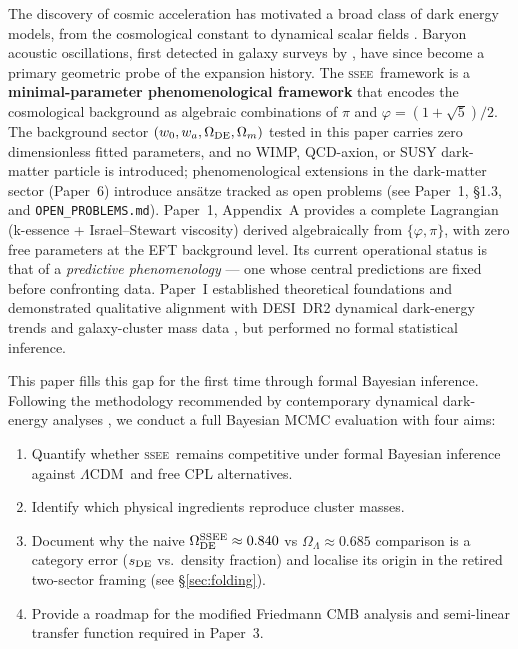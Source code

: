 \documentclass[12pt,a4paper]{article}
\newcommand{\SSEE}{\ifmmode\mathrm{SSEE}\else\textsc{ssee}\fi}
\newcommand{\LCDM}{\ifmmode\Lambda\mathrm{CDM}\else$\Lambda$CDM\fi}
\newcommand{\OmDE}{\Omega_{\mathrm{DE}}}
\begin{document}
The discovery of cosmic acceleration \citep{Perlmutter1999,Riess1998} has motivated
a broad class of dark energy models, from the cosmological constant to dynamical
scalar fields \citep{Weinberg2013,Clifton2012}.
Baryon acoustic oscillations, first detected in galaxy surveys by \citet{Eisenstein2005},
have since become a primary geometric probe of the expansion history.
The \SSEE\ framework \citep{SSEE_paperI} is a
\textbf{minimal-parameter phenomenological framework} that encodes the
cosmological background as algebraic combinations of $\pi$ and
$\varphi=(1+\sqrt{5})/2$.
The background sector $(w_0,w_a,\Omega_{\rm DE},\Omega_m)$ tested in this
paper carries zero dimensionless fitted parameters, and no WIMP, QCD-axion, or SUSY
dark-matter particle is introduced; phenomenological extensions in the dark-matter
sector (Paper~6) introduce ans\"atze tracked as open problems
(see Paper~1, \S1.3, and \texttt{OPEN\_PROBLEMS.md}).
Paper~1, Appendix~A provides a complete Lagrangian (k-essence + Israel--Stewart
viscosity) derived algebraically from $\{\varphi,\pi\}$, with zero free parameters
at the EFT background level.
Its current operational status is that of a
\emph{predictive phenomenology} — one whose central predictions are
fixed before confronting data.
Paper~I established theoretical foundations and demonstrated qualitative
alignment with DESI~DR2 dynamical dark-energy trends \citep{DESI_DR2}
and galaxy-cluster mass data \citep{Zhang2026}, but performed no formal
statistical inference.

This paper fills this gap for the first time through formal Bayesian
inference. Following the methodology recommended by contemporary
dynamical dark-energy analyses \citep{DESI_DR2,Moresco2017}, we conduct a
full Bayesian MCMC evaluation with four aims:
\begin{enumerate}
  \item Quantify whether \SSEE\ remains competitive under formal
    Bayesian inference against \LCDM\ and free CPL alternatives.
  \item Identify which physical ingredients reproduce cluster masses.
  \item Document why the naive $\OmDE^{\SSEE}\approx0.840$ vs
    $\Omega_\Lambda\approx0.685$ comparison is a category error
    ($s_{\rm DE}$ vs.\ density fraction) and localise its origin in the
    retired two-sector framing (see \S\ref{sec:folding}).
  \item Provide a roadmap for the modified Friedmann CMB analysis
    and semi-linear transfer function required in Paper~3.
\end{enumerate}
\end{document}

